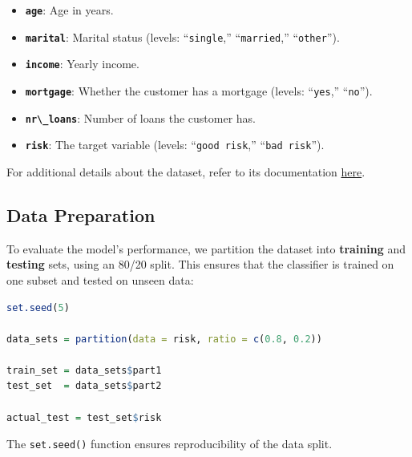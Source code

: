 \documentclass[
]{book}
\newcommand{\passthrough}[1]{#1}
\providecommand{\tightlist}{%
  \setlength{\itemsep}{0pt}\setlength{\parskip}{0pt}}
\theoremstyle{definition}
\theoremstyle{definition}
\theoremstyle{definition}
\theoremstyle{definition}
\theoremstyle{remark}
\begin{document}
\begin{itemize}
\tightlist
\item
  \textbf{\passthrough{\lstinline!age!}}: Age in years.\\
\item
  \textbf{\passthrough{\lstinline!marital!}}: Marital status (levels: ``\passthrough{\lstinline!single!},'' ``\passthrough{\lstinline!married!},'' ``\passthrough{\lstinline!other!}'').\\
\item
  \textbf{\passthrough{\lstinline!income!}}: Yearly income.\\
\item
  \textbf{\passthrough{\lstinline!mortgage!}}: Whether the customer has a mortgage (levels: ``\passthrough{\lstinline!yes!},'' ``\passthrough{\lstinline!no!}'').\\
\item
  \textbf{\passthrough{\lstinline!nr\_loans!}}: Number of loans the customer has.\\
\item
  \textbf{\passthrough{\lstinline!risk!}}: The target variable (levels: ``\passthrough{\lstinline!good risk!},'' ``\passthrough{\lstinline!bad risk!}'').
\end{itemize}

For additional details about the dataset, refer to its documentation \href{https://search.r-project.org/CRAN/refmans/liver/html/risk.html}{here}.

\subsection*{Data Preparation}\label{data-preparation-1}

To evaluate the model's performance, we partition the dataset into \textbf{training} and \textbf{testing} sets, using an 80/20 split. This ensures that the classifier is trained on one subset and tested on unseen data:

\begin{lstlisting}[language=R]
set.seed(5)

data_sets = partition(data = risk, ratio = c(0.8, 0.2))

train_set = data_sets$part1
test_set  = data_sets$part2

actual_test = test_set$risk
\end{lstlisting}

The \passthrough{\lstinline!set.seed()!} function ensures reproducibility of the data split.
\end{document}
